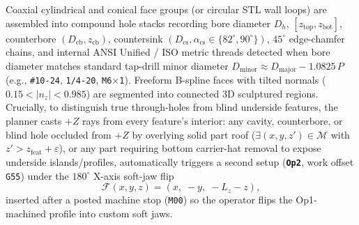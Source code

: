 \documentclass[conference]{IEEEtran}
\begin{document}
Coaxial cylindrical and conical face groups (or circular STL wall loops) are assembled into compound hole stacks recording bore diameter $D_h$, $[z_{\text{top}}, z_{\text{bot}}]$, counterbore $(D_{\text{cb}}, z_{\text{cb}})$, countersink $(D_{\text{cs}}, \alpha_{\text{cs}} \in \{82^\circ, 90^\circ\})$, $45^\circ$ edge-chamfer chains, and internal ANSI Unified / ISO metric threads detected when bore diameter matches standard tap-drill minor diameter $D_{\text{minor}} \approx D_{\text{major}} - 1.0825\,P$ (e.g., \texttt{\#10-24}, \texttt{1/4-20}, \texttt{M6$\times$1}). Freeform B-spline faces with tilted normals ($0.15 < |n_z| < 0.985$) are segmented into connected 3D sculptured regions. Crucially, to distinguish true through-holes from blind underside features, the planner casts $+Z$ rays from every feature's interior: any cavity, counterbore, or blind hole occluded from $+Z$ by overlying solid part roof ($\exists (x, y, z') \in \mathcal{M}$ with $z' > z_{\text{feat}} + \varepsilon$), or any part requiring bottom carrier-hat removal to expose underside islands/profiles, automatically triggers a second setup (\textbf{\texttt{Op2}}, work offset \texttt{G55}) under the $180^\circ$ X-axis soft-jaw flip
\begin{equation}
  \mathcal{F}(x, y, z) = (x,\; -y,\; -L_z - z),
  \label{eq:op2_flip}
\end{equation}
inserted after a posted machine stop (\texttt{M00}) so the operator flips the Op1-machined profile into custom soft jaws.
\end{document}
